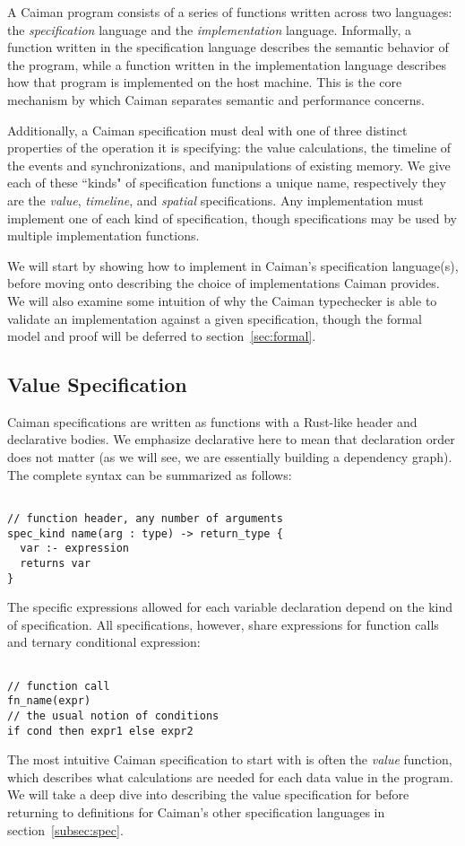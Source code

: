 A Caiman program consists of a series of functions written across two languages: the \textit{specification} language and the \textit{implementation} language.  Informally, a function written in the specification language describes the semantic behavior of the program, while a function written in the implementation language describes how that program is implemented on the host machine.  This is the core mechanism by which Caiman separates semantic and performance concerns.

Additionally, a Caiman specification must deal with one of three distinct properties of the operation it is specifying: the value calculations, the timeline of the events and synchronizations, and manipulations of existing memory.  We give each of these ``kinds" of specification functions a unique name, respectively they are the \textit{value}, \textit{timeline}, and \textit{spatial} specifications.  Any implementation must implement one of each kind of specification, though specifications may be used by multiple implementation functions.

We will start by showing how to implement  in Caiman's specification language(s), before moving onto describing the choice of implementations Caiman provides.  We will also examine some intuition of why the Caiman typechecker is able to validate an implementation against a given specification, though the formal model and proof will be deferred to section~\ref{sec:formal}.

\subsection{Value Specification}
\label{subsec:value}

Caiman specifications are written as functions with a Rust-like header and declarative bodies.  We emphasize declarative here to mean that declaration order does not matter (as we will see, we are essentially building a dependency graph).  The complete syntax can be summarized as follows:
%
\begin{lstlisting}

// function header, any number of arguments
spec_kind name(arg : type) -> return_type {
  var :- expression
  returns var
}
\end{lstlisting}
%
The specific expressions allowed for each variable declaration depend on the kind of specification.  All specifications, however, share expressions for function calls and ternary conditional expression:
%
\begin{lstlisting}

// function call
fn_name(expr)
// the usual notion of conditions
if cond then expr1 else expr2
\end{lstlisting}
%
The most intuitive Caiman specification to start with is often the \textit{value} function, which describes what calculations are needed for each data value in the program.  We will take a deep dive into describing the value specification for  before returning to definitions for Caiman's other specification languages in section~\ref{subsec:spec}.  


